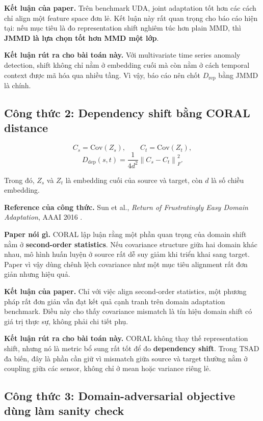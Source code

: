 \documentclass[a4paper]{article}
\begin{document}
\textbf{Kết luận của paper.} Trên benchmark UDA, joint adaptation tốt hơn các cách chỉ align một feature space đơn lẻ. Kết luận này rất quan trọng cho báo cáo hiện tại: nếu mục tiêu là đo representation shift nghiêm túc hơn plain MMD, thì \textbf{JMMD là lựa chọn tốt hơn MMD một lớp}.

\textbf{Kết luận rút ra cho bài toán này.} Với multivariate time series anomaly detection, shift không chỉ nằm ở embedding cuối mà còn nằm ở cách temporal context được mã hóa qua nhiều tầng. Vì vậy, báo cáo nên chốt \(D_{\mathrm{rep}}\) bằng JMMD là chính.

\subsection{Công thức 2: Dependency shift bằng CORAL distance}

\[
C_s = \mathrm{Cov}(Z_s),
\qquad
C_t = \mathrm{Cov}(Z_t),
\]
\[
D_{\mathrm{dep}}(s,t) = \frac{1}{4d^2}\left\| C_s - C_t \right\|_F^2.
\]

Trong đó, \(Z_s\) và \(Z_t\) là embedding cuối của source và target, còn \(d\) là số chiều embedding.

\textbf{Reference của công thức.} Sun et al., \emph{Return of Frustratingly Easy Domain Adaptation}, AAAI 2016 \cite{coral}.

\textbf{Paper nói gì.} CORAL lập luận rằng một phần quan trọng của domain shift nằm ở \textbf{second-order statistics}. Nếu covariance structure giữa hai domain khác nhau, mô hình huấn luyện ở source rất dễ suy giảm khi triển khai sang target. Paper vì vậy dùng chênh lệch covariance như một mục tiêu alignment rất đơn giản nhưng hiệu quả.

\textbf{Kết luận của paper.} Chỉ với việc align second-order statistics, một phương pháp rất đơn giản vẫn đạt kết quả cạnh tranh trên domain adaptation benchmark. Điều này cho thấy covariance mismatch là tín hiệu domain shift có giá trị thực sự, không phải chi tiết phụ.

\textbf{Kết luận rút ra cho bài toán này.} CORAL không thay thế representation shift, nhưng nó là metric bổ sung rất tốt để đo \textbf{dependency shift}. Trong TSAD đa biến, đây là phần cần giữ vì mismatch giữa source và target thường nằm ở coupling giữa các sensor, không chỉ ở mean hoặc variance riêng lẻ.

\subsection{Công thức 3: Domain-adversarial objective dùng làm sanity check}
\end{document}
